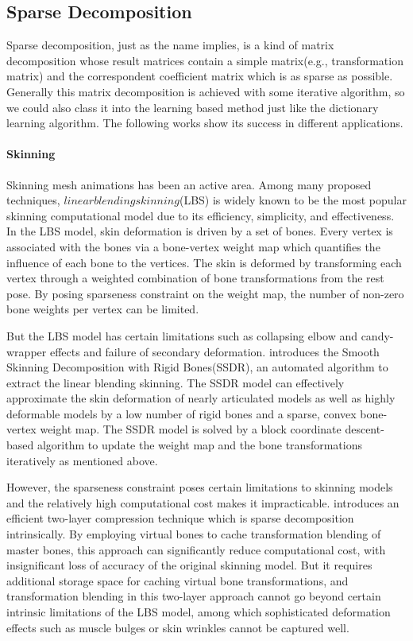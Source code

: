 \label{sec:Learning}

\subsection{Sparse Decomposition}

Sparse decomposition, just as the name implies, is a kind of matrix decomposition whose result matrices contain a simple matrix(e.g., transformation matrix\cite{le2012smooth}) and the correspondent coefficient matrix which is as sparse as possible. Generally this matrix decomposition is achieved with some iterative algorithm, so we could also class it into the learning based method just like the dictionary learning algorithm. The following works show its success in different applications.

\paragraph{Skinning}

Skinning mesh animations has been an active area. Among many proposed techniques, $linear blending skinning$(LBS) is widely known to be the most popular skinning computational model due to its efficiency, simplicity, and effectiveness. In the LBS model, skin deformation is driven by a set of bones. Every vertex is associated with the bones via a bone-vertex weight map which quantifies the influence of each bone to the vertices. The skin is deformed by transforming each vertex through a weighted combination of bone transformations from the rest pose. By posing sparseness constraint on the weight map, the number of non-zero bone weights per vertex can be limited.

But the LBS model has certain limitations such as collapsing elbow and candy-wrapper effects and failure of secondary deformation. \cite{le2012smooth} introduces the Smooth Skinning Decomposition with Rigid Bones(SSDR), an automated algorithm to extract the linear blending skinning. The SSDR model can effectively approximate the skin deformation of nearly articulated models as well as highly deformable models by a low number of rigid bones and a sparse, convex bone-vertex weight map. The SSDR model is solved by a block coordinate descent-based algorithm to update the weight map and the bone transformations iteratively as mentioned above.

However, the sparseness constraint poses certain limitations to skinning models and the relatively high computational cost makes it impracticable.
\cite{le2013two} introduces an efficient two-layer compression technique which is sparse decomposition intrinsically. 
By employing virtual bones to cache transformation blending of master bones, this approach can significantly reduce computational cost, with insignificant loss of accuracy of the original skinning model. But it requires additional storage space for caching virtual bone transformations, and transformation blending in this two-layer approach cannot go beyond certain intrinsic limitations of the LBS model, among which sophisticated deformation effects such as muscle bulges or skin wrinkles cannot be captured well.

